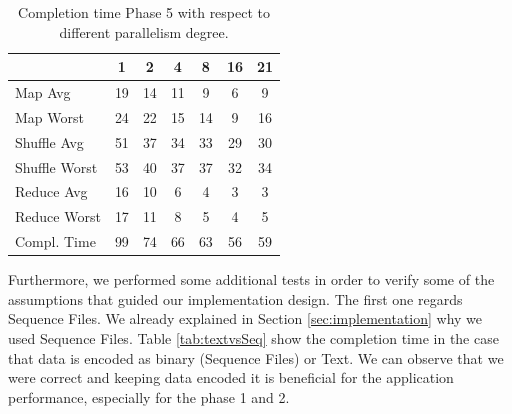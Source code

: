 \begin{table}[h!]
\begin{center}
\begin{tabular}{ | l || c | c | c | c |  c | c | }

  \hline      
   						& 1 		& 2 		& 4 		& 8 		&16 		& 21 \\
  \hline      \hline
  Map Avg 		& 19 	& 14 	& 11 	& 9 		& 6 		& 9   \\
  Map Worst 		& 24 	& 22 	& 15		& 14 	& 9 		& 16  	\\
  \hline
  Shuffle Avg 	& 51 	& 37 	& 34 	& 33 	& 29 	& 30   \\ 
  Shuffle Worst 	& 53 	& 40 	& 37 	& 37 	& 32 	& 34   \\
  \hline
  Reduce Avg	& 16 	& 10 	& 6 		& 4 		& 3 		& 3     \\
  Reduce Worst	& 17 	& 11 	& 8 		& 5 		& 4 		& 5     \\
  \hline  
  Compl. Time &	99	&	74	&	66	&	63	&	56	&	59	\\
  \hline


\end{tabular} 
  \end{center}
  \caption{Completion time Phase 5 with respect to different parallelism degree.}
    \label{tab:Phase 5}
\end{table}






Furthermore, we performed some additional tests in order to verify some of the assumptions that guided our implementation design. 
The first one regards Sequence Files.
We already explained in Section \ref{sec:implementation} why we used Sequence Files. 
Table \ref{tab:textvsSeq} show the completion time in the case that data is encoded as binary (Sequence Files) or Text. 
We can observe that we were correct and keeping data encoded it is beneficial for the application performance, especially for the phase 1 and 2.

